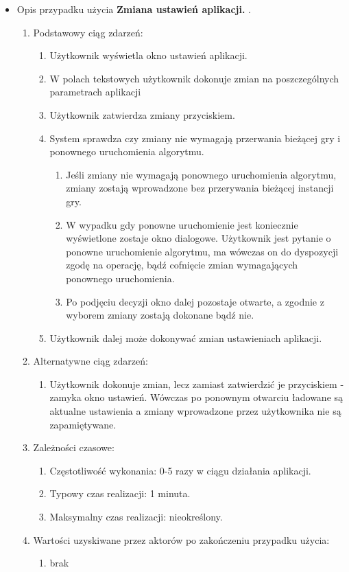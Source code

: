 \begin{par}
\begin{itemize}
	\item
	Opis przypadku użycia {\bf Zmiana ustawień aplikacji. }.
	\begin{enumerate}
	\item Podstawowy ciąg zdarzeń:
		\begin{enumerate}
		\item Użytkownik wyświetla okno ustawień aplikacji.
		\item W polach tekstowych użytkownik dokonuje zmian na poszczególnych parametrach aplikacji
		\item Użytkownik zatwierdza zmiany przyciskiem.
		\item System sprawdza czy zmiany nie wymagają przerwania bieżącej gry i ponownego uruchomienia algorytmu.
		\begin{enumerate}
			\item Jeśli zmiany nie wymagają ponownego uruchomienia algorytmu, zmiany zostają wprowadzone bez przerywania bieżącej instancji gry.
			\item W wypadku gdy ponowne uruchomienie jest koniecznie wyświetlone zostaje okno dialogowe.
			Użytkownik jest pytanie o ponowne uruchomienie algorytmu, ma wówczas on do dyspozycji zgodę na operację, bądź cofnięcie zmian wymagających ponownego uruchomienia.
			\item Po podjęciu decyzji okno dalej pozostaje otwarte, a zgodnie z wyborem zmiany zostają dokonane bądź nie.
		\end{enumerate}
		\item Użytkownik dalej może dokonywać zmian ustawieniach aplikacji.
		\end{enumerate}
	\item Alternatywne ciąg zdarzeń:
		\begin{enumerate}
		\item Użytkownik dokonuje zmian, lecz zamiast zatwierdzić je przyciskiem - zamyka okno ustawień. Wówczas po ponownym otwarciu ładowane są aktualne ustawienia a zmiany wprowadzone przez użytkownika nie są zapamiętywane.
		\end{enumerate}
	\item Zależności czasowe:
		\begin{enumerate}
		\item Częstotliwość wykonania: 0-5 razy w ciągu działania aplikacji.
		\item Typowy czas realizacji: 1 minuta.
		\item Maksymalny czas realizacji: nieokreślony.
		\end{enumerate}
	\item Wartości uzyskiwane przez aktorów po zakończeniu przypadku użycia:
		\begin{enumerate}
		\item brak
		\end{enumerate}
	\end{enumerate}


\end{itemize}
\end{par}
